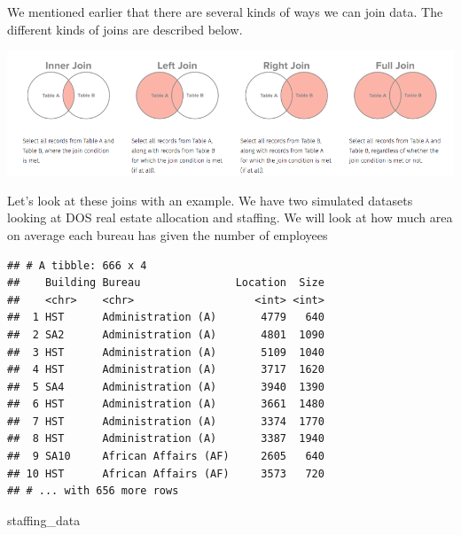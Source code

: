 \documentclass[12pt,letterpaperpaper,openany]{book}
\newenvironment{Shaded}{\begin{snugshade}}{\end{snugshade}}
\newcommand{\KeywordTok}[1]{\textcolor[rgb]{0.13,0.29,0.53}{\textbf{#1}}}
\newcommand{\NormalTok}[1]{#1}
\newcommand{\OperatorTok}[1]{\textcolor[rgb]{0.81,0.36,0.00}{\textbf{#1}}}
\newcommand{\StringTok}[1]{\textcolor[rgb]{0.31,0.60,0.02}{#1}}
\begin{document}
We mentioned earlier that there are several kinds of ways we can join data. The
different kinds of joins are described below.

\includegraphics{img/joins.png}

Let's look at these joins with an example. We have two simulated datasets looking at
DOS real estate allocation and staffing. We will look at how much area on average each
bureau has given the number of employees

\begin{Shaded}
\end{Shaded}

\begin{verbatim}
## # A tibble: 666 x 4
##    Building Bureau               Location  Size
##    <chr>    <chr>                   <int> <int>
##  1 HST      Administration (A)       4779   640
##  2 SA2      Administration (A)       4801  1090
##  3 HST      Administration (A)       5109  1040
##  4 HST      Administration (A)       3717  1620
##  5 SA4      Administration (A)       3940  1390
##  6 HST      Administration (A)       3661  1480
##  7 HST      Administration (A)       3374  1770
##  8 HST      Administration (A)       3387  1940
##  9 SA10     African Affairs (AF)     2605   640
## 10 HST      African Affairs (AF)     3573   720
## # ... with 656 more rows
\end{verbatim}

\begin{Shaded}
\begin{Highlighting}[]
\NormalTok{staffing_data}
\end{Highlighting}
\end{Shaded}
\end{document}
